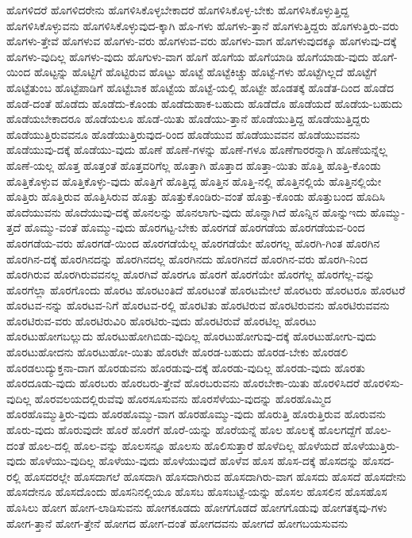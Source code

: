 {ಹೊಗಳಿದರೆ
ಹೊಗಳಿದರೇನು
ಹೊಗಳಿಸಿಕೊಳ್ಳಬೇಕಾದರೆ
ಹೊಗಳಿಸಿಕೊಳ್ಳ-ಬೇಕು
ಹೊಗಳಿಸಿಕೊಳ್ಳುತ್ತಿದ್ದ
ಹೊಗಳಿಸಿಕೊಳ್ಳುವನು
ಹೊಗಳಿಸಿಕೊಳ್ಳುವುದ-ಕ್ಕಾಗಿ
ಹೊ-ಗಳು
ಹೊಗಳು-ತ್ತಾನೆ
ಹೊಗಳುತ್ತಿದ್ದರು
ಹೊಗಳುತ್ತಿರು-ವರು
ಹೊಗಳು-ತ್ತೇವೆ
ಹೊಗಳುವ
ಹೊಗಳು-ವರು
ಹೊಗಳುವ-ವರು
ಹೊಗಳು-ವಾಗ
ಹೊಗಳುವುದಕ್ಕೂ
ಹೊಗಳುವು-ದಕ್ಕೆ
ಹೊಗಳು-ವುದಿಲ್ಲ
ಹೊಗಳು-ವುದು
ಹೊಗುಳು-ವಾಗ
ಹೊಗೆ
ಹೊಗೆಯ
ಹೊಗೆಯಾಡಿ
ಹೊಗೆಯಾಡು-ವುದು
ಹೊಗೆ-ಯಿಂದ
ಹೊಟ್ಟನ್ನು
ಹೊಟ್ಟಿಗೆ
ಹೊಟ್ಟಿರುವ
ಹೊಟ್ಟು
ಹೊಟ್ಟೆ
ಹೊಟ್ಟೆಕಿಚ್ಚು
ಹೊಟ್ಟೆ-ಗಳು
ಹೊಟ್ಟೆಗಿಲ್ಲದೆ
ಹೊಟ್ಟೆಗೆ
ಹೊಟ್ಟೆತುಂಬ
ಹೊಟ್ಟೆಪಾಡಿಗೆ
ಹೊಟ್ಟೆಬಾಕ
ಹೊಟ್ಟೆಯ
ಹೊಟ್ಟೆ-ಯಲ್ಲಿ
ಹೊಟ್ಟೇ
ಹೊಡತಕ್ಕೆ
ಹೊಡೆತ-ದಿಂದ
ಹೊಡೆದ
ಹೊಡೆ-ದಂತೆ
ಹೊಡೆದು
ಹೊಡೆದು-ಕೊಂಡು
ಹೊಡೆದುಹಾಕ-ಬಹುದು
ಹೊಡೆದೊ
ಹೊಡೆಯದೆ
ಹೊಡೆಯ-ಬಹುದು
ಹೊಡೆಯಬೇಕಾದರೂ
ಹೊಡೆಯಲೂ
ಹೊಡೆ-ಯಿತು
ಹೊಡೆಯು-ತ್ತಾನೆ
ಹೊಡೆಯುತ್ತಿದ್ದ
ಹೊಡೆಯುತ್ತಿದ್ದರು
ಹೊಡೆಯುತ್ತಿರುವವನೂ
ಹೊಡೆಯುತ್ತಿರುವುದ-ರಿಂದ
ಹೊಡೆಯುವ
ಹೊಡೆಯುವವನ
ಹೊಡೆಯುವವನು
ಹೊಡೆಯುವು-ದಕ್ಕೆ
ಹೊಡೆಯು-ವುದು
ಹೊಣೆ
ಹೊಣೆ-ಗಳನ್ನು
ಹೊಣೆ-ಗಳೂ
ಹೊಣೆಗಾರರನ್ನಾಗಿ
ಹೊಣೆಯನ್ನೆಲ್ಲ
ಹೊಣೆ-ಯಲ್ಲ
ಹೊತ್ತ
ಹೊತ್ತಂತೆ
ಹೊತ್ತವರಿಗೆಲ್ಲ
ಹೊತ್ತಾಗಿ
ಹೊತ್ತಾದ
ಹೊತ್ತಾ-ಯಿತು
ಹೊತ್ತಿ
ಹೊತ್ತಿ-ಕೊಂಡು
ಹೊತ್ತಿಕೊಳ್ಳುವ
ಹೊತ್ತಿಕೊಳ್ಳು-ವುದು
ಹೊತ್ತಿಗೆ
ಹೊತ್ತಿದ್ದ
ಹೊತ್ತಿನ
ಹೊತ್ತಿ-ನಲ್ಲಿ
ಹೊತ್ತಿನಲ್ಲಿಯೆ
ಹೊತ್ತಿನಲ್ಲಿಯೇ
ಹೊತ್ತಿರು
ಹೊತ್ತಿರುವ
ಹೊತ್ತಿಸಿರುವ
ಹೊತ್ತು
ಹೊತ್ತುಕೊಂಡಿರು-ವಂತೆ
ಹೊತ್ತು-ಕೊಂಡು
ಹೊತ್ತುಬಂದ
ಹೊದಿಸಿ
ಹೊದೆಯುವನು
ಹೊದೆಯುವು-ದಕ್ಕೆ
ಹೊನಲನ್ನು
ಹೊನಲಾಗು-ವುದು
ಹೊನ್ನಾಗಿದೆ
ಹೊನ್ನಿನ
ಹೊನ್ನುಇದು
ಹೊಮ್ಮು-ತ್ತದೆ
ಹೊಮ್ಮು-ವಂತೆ
ಹೊಮ್ಮು-ವುದು
ಹೊರಗಟ್ಟ-ಬೇಕು
ಹೊರಗಡೆ
ಹೊರಗಡೆಯ
ಹೊರಗಡೆಯವ-ರಿಂದ
ಹೊರಗಡೆಯ-ವರು
ಹೊರಗಡೆ-ಯಿಂದ
ಹೊರಗಡೆಯೆಲ್ಲ
ಹೊರಗಡೆಯೇ
ಹೊರಗಲ್ಲ
ಹೊರಗಿ-ಗಿಂತ
ಹೊರಗಿನ
ಹೊರಗಿನ-ದಕ್ಕೆ
ಹೊರಗಿನದನ್ನು
ಹೊರಗಿನದಲ್ಲ
ಹೊರಗಿನದು
ಹೊರಗಿನದೆ
ಹೊರಗಿನ-ವರು
ಹೊರಗಿ-ನಿಂದ
ಹೊರಗಿರುವ
ಹೊರಗಿರುವವನಲ್ಲ
ಹೊರಗಿವೆ
ಹೊರಗೂ
ಹೊರಗೆ
ಹೊರಗೆಯೇ
ಹೊರಗೆಲ್ಲ
ಹೊರಗೆಲ್ಲ-ವನ್ನು
ಹೊರಗೆಲ್ಲಾ
ಹೊರಗೊಂದು
ಹೊರಟ
ಹೊರಟಂತಿದೆ
ಹೊರಟಂತೆ
ಹೊರಟಮೇಲೆ
ಹೊರಟರು
ಹೊರಟರೂ
ಹೊರಟರೆ
ಹೊರಟವ-ನನ್ನು
ಹೊರಟವ-ನಿಗೆ
ಹೊರಟವ-ರಲ್ಲಿ
ಹೊರಟಿತು
ಹೊರಟಿರುವ
ಹೊರಟಿರುವನು
ಹೊರಟಿರುವವನು
ಹೊರಟಿರುವ-ವರು
ಹೊರಟಿರುವಿರಿ
ಹೊರಟಿರು-ವುದು
ಹೊರಟಿರುವೆ
ಹೊರಟಿಲ್ಲ
ಹೊರಟು
ಹೊರಟುಹೋಗಬಲ್ಲುದು
ಹೊರಟುಹೋಗಿಬಿಡು-ವುದಿಲ್ಲ
ಹೊರಟುಹೋಗುವು-ದಕ್ಕೆ
ಹೊರಟುಹೋಗು-ವುದು
ಹೊರಟುಹೋದನು
ಹೊರಟುಹೋ-ಯಿತು
ಹೊರಟೇ
ಹೊರಡ-ಬಹುದು
ಹೊರಡ-ಬೇಕು
ಹೊರಡಲಿ
ಹೊರಡಲುದ್ಯುಕ್ತನಾ-ದಾಗ
ಹೊರಡುವನು
ಹೊರಡುವು-ದಕ್ಕೆ
ಹೊರಡು-ವುದಿಲ್ಲ
ಹೊರಡು-ವುದು
ಹೊರತು
ಹೊರದೂಡು-ವುದು
ಹೊರಬರು
ಹೊರಬರು-ತ್ತೇವೆ
ಹೊರಬರುವನು
ಹೊರಬೇಕಾ-ಯಿತು
ಹೊರಳಿಸಿದರೆ
ಹೊರಳಿಸು-ವುದಿಲ್ಲ
ಹೊರವಲಯದಲ್ಲಿರುವೆವು
ಹೊರಸೂಸುವನು
ಹೊರಸೆಳೆಯು-ವುದನ್ನು
ಹೊರಹೊಮ್ಮಿದ
ಹೊರಹೊಮ್ಮುತ್ತಿರು-ವುದು
ಹೊರಹೊಮ್ಮು-ವಾಗ
ಹೊರಹೊಮ್ಮು-ವುದು
ಹೊರುತ್ತಿ
ಹೊರುತ್ತಿರುವ
ಹೊರುವನು
ಹೊರು-ವುದು
ಹೊರುವುದೇ
ಹೊರೆ
ಹೊರೆಗೆ
ಹೊರೆ-ಯನ್ನು
ಹೊರೆಯನ್ನೆ
ಹೊಲ
ಹೊಲಕ್ಕೆ
ಹೊಲಗದ್ದೆಗೆ
ಹೊಲ-ದಂತೆ
ಹೊಲ-ದಲ್ಲಿ
ಹೊಲ-ವನ್ನು
ಹೊಲಸನ್ನೂ
ಹೊಲಸು
ಹೊಲಿಸುತ್ತಾರೆ
ಹೊಳೆದಿಲ್ಲ
ಹೊಳೆಯದೆ
ಹೊಳೆಯುತ್ತಿರು-ವುದು
ಹೊಳೆಯು-ವುದಿಲ್ಲ
ಹೊಳೆಯು-ವುದು
ಹೊಳೆಯುವುದೆ
ಹೊಳೆವ
ಹೊಸ
ಹೊಸ-ದಕ್ಕೆ
ಹೊಸದನ್ನು
ಹೊಸದ-ರಲ್ಲಿ
ಹೊಸದರಲ್ಲೇ
ಹೊಸದಾಗಲೆ
ಹೊಸದಾಗಿ
ಹೊಸದಾಗಿರುವ
ಹೊಸದಾಗಿರು-ವಾಗ
ಹೊಸದು
ಹೊಸದೆ
ಹೊಸದೇನು
ಹೊಸದೇನೂ
ಹೊಸದೊಂದು
ಹೊಸನಿನಲ್ಲಿಯೂ
ಹೊಸಬ
ಹೊಸಬಟ್ಟೆ-ಯನ್ನು
ಹೊಸಲ
ಹೊಸಲಿನ
ಹೊಸಹೊಸ
ಹೊಸಿಲು
ಹೋಗ
ಹೋಗ-ಲಾಡಿಸುವನು
ಹೋಗಕೂಡದು
ಹೋಗಗೊಡದೆ
ಹೋಗಗೊಡುವು
ಹೋಗತಕ್ಕವು-ಗಳು
ಹೋಗ-ತ್ತಾನೆ
ಹೋಗ-ತ್ತೇನೆ
ಹೋಗದ
ಹೋಗ-ದಂತೆ
ಹೋಗದವನು
ಹೋಗದೆ
ಹೋಗಬಯಸುವನು
}
